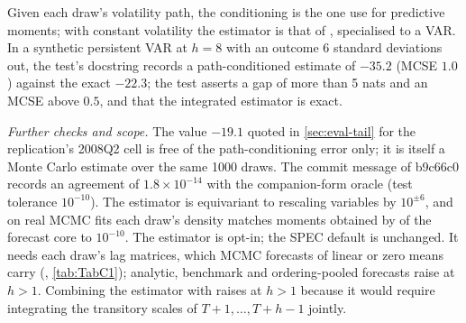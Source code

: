 Given each draw's volatility path, the conditioning is the one \citet[Appendix~D]{hiraki2026dynamic}
use for predictive moments; with constant volatility the estimator is that of
\citet{warne2017marginalized}, specialised to a VAR.
In a synthetic persistent VAR at $h = 8$ with an outcome 6 standard deviations out, the test's
docstring records a path-conditioned estimate of $-35.2$ (MCSE $1.0$) against the exact $-22.3$; the
test asserts a gap of more than 5 nats and an MCSE above $0.5$, and that the integrated estimator
is exact.

\emph{Further checks and scope.}
The value $-19.1$ quoted in \cref{sec:eval-tail} for the replication's 2008Q2 cell is free of the
path-conditioning error only; it is itself a Monte Carlo estimate over the same 1000 draws.
The commit message of b9c66c0 records an agreement of $1.8\times10^{-14}$ with the companion-form
oracle (test tolerance $10^{-10}$).
The estimator is equivariant to rescaling variables by $10^{\pm6}$, and on real MCMC fits each
draw's density matches moments obtained by  of the forecast core to $10^{-10}$.
The estimator is opt-in; the SPEC default is unchanged.
It needs each draw's lag matrices, which MCMC forecasts of linear or zero means carry
(, \cref{tab:TabC1}); analytic, benchmark and ordering-pooled forecasts raise at
$h > 1$.
Combining the estimator with  raises at $h > 1$ because it would require
integrating the transitory scales of $T+1, \dots, T+h-1$ jointly.


